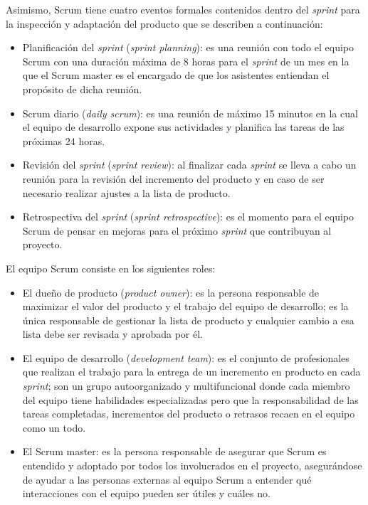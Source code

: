 Asimismo, Scrum tiene cuatro eventos formales contenidos dentro del \textit{sprint} para la inspección y adaptación del producto que se describen a continuación:
\begin{itemize}
	\item Planificación del \textit{sprint} (\textit{sprint planning}): es una reunión con todo el equipo Scrum con una duración máxima de 8 horas para el \textit{sprint} de un mes en la que el Scrum master es el encargado de que los asistentes entiendan el propósito de dicha reunión.
	\item Scrum diario (\textit{daily scrum}): es una reunión de máximo 15 minutos en la cual el equipo de desarrollo expone sus actividades y planifica las tareas de las próximas 24 horas.
	\item Revisión del \textit{sprint} (\textit{sprint review}): al finalizar cada \textit{sprint} se lleva a cabo un reunión para la revisión del incremento del producto y en caso de ser necesario realizar ajustes a la lista de producto.
	\item Retrospectiva del \textit{sprint} (\textit{sprint retrospective}): es el momento para el equipo Scrum de pensar en mejoras para el próximo \textit{sprint} que contribuyan al proyecto.
\end{itemize}

El equipo Scrum consiste en los siguientes roles:
\begin{itemize}
	\item El dueño de producto (\textit{product owner}): es la persona responsable de maximizar el valor del producto y el trabajo del equipo de desarrollo; es la única responsable de gestionar la lista de producto y cualquier cambio a esa lista debe ser revisada y aprobada por él.
	\item El equipo de desarrollo (\textit{development team}): es el conjunto de profesionales que realizan el trabajo para la entrega de un incremento en producto en cada \textit{sprint}; son un grupo autoorganizado y multifuncional donde cada miembro del equipo tiene habilidades especializadas pero que la responsabilidad de las tareas completadas, incrementos del producto o retrasos recaen en el equipo como un todo.
	\item  El Scrum master: es la persona responsable de asegurar que Scrum es entendido y adoptado por todos los involucrados en el proyecto, asegurándose de ayudar a las personas externas al equipo Scrum a entender qué interacciones con el equipo pueden ser útiles y cuáles no.
\end{itemize}


